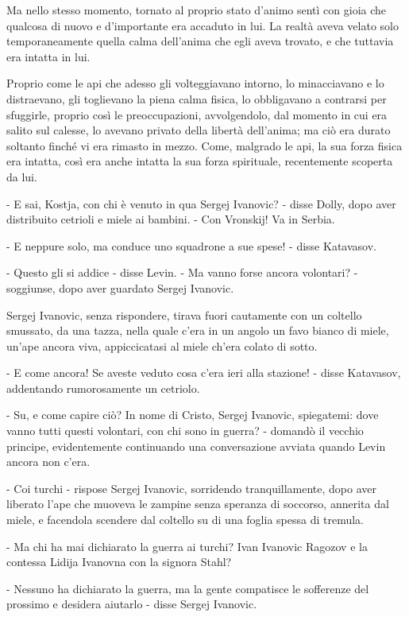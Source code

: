 Ma nello stesso momento, tornato al proprio stato d'animo sentì con gioia che qualcosa di nuovo e d'importante era accaduto in lui. La realtà aveva velato solo temporaneamente quella calma dell'anima che egli aveva trovato, e che tuttavia era intatta in lui. 

Proprio come le api che adesso gli volteggiavano intorno, lo minacciavano e lo distraevano, gli toglievano la piena calma fisica, lo obbligavano a contrarsi per sfuggirle, proprio così le preoccupazioni, avvolgendolo, dal momento in cui era salito sul calesse, lo avevano privato della libertà dell'anima; ma ciò era durato soltanto finché vi era rimasto in mezzo. Come, malgrado le api, la sua forza fisica era intatta, così era anche intatta la sua forza spirituale, recentemente scoperta da lui. 

\label{xv-7} 

- E sai, Kostja, con chi è venuto in qua Sergej Ivanovic? - disse Dolly, dopo aver distribuito cetrioli e miele ai bambini. - Con Vronskij! Va in Serbia. 

- E neppure solo, ma conduce uno squadrone a sue spese! - disse Katavasov. 

- Questo gli si addice - disse Levin. - Ma vanno forse ancora volontari? - soggiunse, dopo aver guardato Sergej Ivanovic. 

Sergej Ivanovic, senza rispondere, tirava fuori cautamente con un coltello smussato, da una tazza, nella quale c'era in un angolo un favo bianco di miele, un'ape ancora viva, appiccicatasi al miele ch'era colato di sotto. 

- E come ancora! Se aveste veduto cosa c'era ieri alla stazione! - disse Katavasov, addentando rumorosamente un cetriolo. 

- Su, e come capire ciò? In nome di Cristo, Sergej Ivanovic, spiegatemi: dove vanno tutti questi volontari, con chi sono in guerra? - domandò il vecchio principe, evidentemente continuando una conversazione avviata quando Levin ancora non c'era. 

- Coi turchi - rispose Sergej Ivanovic, sorridendo tranquillamente, dopo aver liberato l'ape che muoveva le zampine senza speranza di soccorso, annerita dal miele, e facendola scendere dal coltello su di una foglia spessa di tremula. 

- Ma chi ha mai dichiarato la guerra ai turchi? Ivan Ivanovic Ragozov e la contessa Lidija Ivanovna con la signora Stahl? 

- Nessuno ha dichiarato la guerra, ma la gente compatisce le sofferenze del prossimo e desidera aiutarlo - disse Sergej Ivanovic. 


